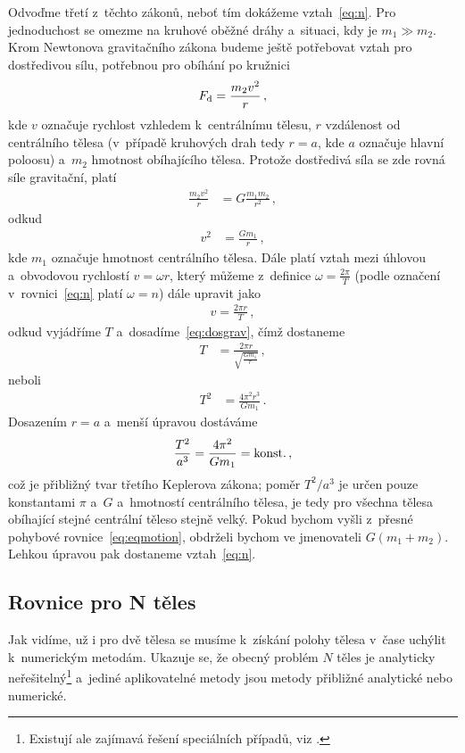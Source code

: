 \documentclass[A4paper, 12pt, oneside]{book}
\begin{document}
Odvoďme třetí z~těchto zákonů, neboť tím dokážeme vztah~\eqref{eq:n}. Pro jednoduchost se omezme na kruhové oběžné dráhy a~situaci, kdy je $m_1 \gg m_2$. Krom Newtonova gravitačního zákona budeme ještě potřebovat vztah pro dostředivou sílu, potřebnou pro obíhání po kružnici
\begin{align}
	F_{\rm d}=\frac{m_2v^2}{r}\,,
\end{align}
kde $v$ označuje rychlost vzhledem k~centrálnímu tělesu, $r$ vzdálenost od centrálního tělesa (v~případě kruhových drah tedy $r=a$, kde $a$ označuje hlavní poloosu) a~$m_2$ hmotnost obíhajícího tělesa. Protože dostředivá síla se zde rovná síle gravitační, platí
\begin{align}
	\frac{m_2v^2}{r}&=G\frac{m_1m_2}{r^2}\,,
\end{align}
	odkud
\begin{align}
	v^2&=\frac{Gm_1}{r}\,, \label{eq:dosgrav}
\end{align}
kde $m_1$ označuje hmotnost centrálního tělesa. Dále platí vztah mezi úhlovou a~obvodovou rychlostí $v=\omega r$, který můžeme z~definice $\omega=\frac{2\pi}{T}$ (podle označení v~rovnici~\eqref{eq:n} platí $\omega=n$) dále upravit jako
\begin{align}
	v=\frac{2\pi r}{T}\,,
\end{align}
odkud vyjádříme $T$ a~dosadíme~\eqref{eq:dosgrav}, čímž dostaneme
\begin{align}
	T&=\frac{2\pi r}{\sqrt{\frac{Gm_1}{r}}}\,,
\end{align}
	neboli
\begin{align}
	T^2&=\frac{4\pi^2 r^3}{Gm_1}\,.
\end{align}
Dosazením $r=a$ a~menší úpravou dostáváme
\begin{align}
	\frac{T^2}{a^3}=\frac{4\pi^2}{Gm_1}={\rm konst.}\,,
\end{align}
což je přibližný tvar třetího Keplerova zákona; poměr $T^2/a^3$ je určen pouze konstantami $\pi$ a~$G$ a~hmotností centrálního tělesa, je tedy pro všechna tělesa obíhající stejné centrální těleso stejně velký. Pokud bychom vyšli z~přesné pohybové rovnice~\eqref{eq:eqmotion}, obdrželi bychom ve jmenovateli $G(m_1+m_2)$. Lehkou úpravou pak dostaneme vztah~\eqref{eq:n}.

\subsection{Rovnice pro N těles}
Jak vidíme, už i pro dvě tělesa se musíme k~získání polohy tělesa v~čase uchýlit k~numerickým metodám. Ukazuje se, že obecný problém $N$ těles je analyticky neřešitelný\footnote{Existují ale zajímavá řešení speciálních případů, viz \cite{cohan12}.} a~jediné aplikovatelné metody jsou metody přibližné analytické nebo numerické.
\end{document}
